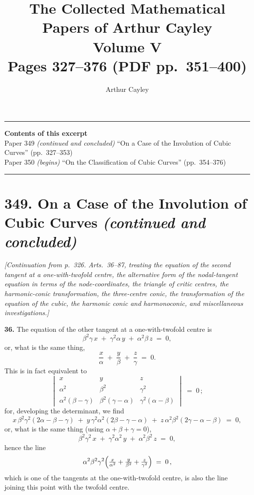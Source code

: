 \documentclass[11pt,a4paper]{article}
\title{\textbf{The Collected Mathematical Papers of Arthur Cayley}\\[6pt]
\Large Volume V\\[12pt]
\large Pages 327--376 \;(PDF pp.\ 351--400)}
\author{Arthur Cayley}
\date{}
\begin{document}
\maketitle
\thispagestyle{empty}

\vspace{1em}
\noindent\rule{\textwidth}{0.4pt}
\vspace{1em}

\begin{center}
\textbf{Contents of this excerpt}\\[4pt]
Paper 349 \textit{(continued and concluded)} ``On a Case of the Involution of Cubic Curves'' (pp.~327--353)\\
Paper 350 \textit{(begins)} ``On the Classification of Cubic Curves'' (pp.~354--376)
\end{center}

\noindent\rule{\textwidth}{0.4pt}
\vspace{1em}

\section*{349. On a Case of the Involution of Cubic Curves \textit{(continued and concluded)}}

\noindent\textit{[Continuation from p.~326. Arts.~36--87, treating the equation of the second tangent at a one-with-twofold centre, the alternative form of the nodal-tangent equation in terms of the node-coordinates, the triangle of critic centres, the harmonic-conic transformation, the three-centre conic, the transformation of the equation of the cubic, the harmonic conic and harmonoconic, and miscellaneous investigations.]}

\medskip

\textbf{36.} The equation of the other tangent at a one-with-twofold centre is
\[
\beta^{2}\gamma\,x \;+\; \gamma^{2}\alpha\,y \;+\; \alpha^{2}\beta\,z \;=\; 0,
\]
or, what is the same thing,
\[
\frac{x}{\alpha} \;+\; \frac{y}{\beta} \;+\; \frac{z}{\gamma} \;=\; 0.
\]
This is in fact equivalent to
\[
\begin{vmatrix}
x & y & z \\
\alpha^{2} & \beta^{2} & \gamma^{2} \\
\alpha^{2}(\beta-\gamma) & \beta^{2}(\gamma-\alpha) & \gamma^{2}(\alpha-\beta)
\end{vmatrix}
\;=\; 0\,;
\]
for, developing the determinant, we find
\[
x\,\beta^{2}\gamma^{2}(2\alpha-\beta-\gamma) \;+\; y\,\gamma^{2}\alpha^{2}(2\beta-\gamma-\alpha) \;+\; z\,\alpha^{2}\beta^{2}(2\gamma-\alpha-\beta) \;=\; 0,
\]
or, what is the same thing (using $\alpha+\beta+\gamma=0$),
\[
\beta^{2}\gamma^{2}\,x \;+\; \gamma^{2}\alpha^{2}\,y \;+\; \alpha^{2}\beta^{2}\,z \;=\; 0,
\]
hence the line
\[
\alpha^{2}\beta^{2}\gamma^{2}\Bigl(\tfrac{x}{\alpha^{2}}+\tfrac{y}{\beta^{2}}+\tfrac{z}{\gamma^{2}}\Bigr) \;=\; 0\,,
\]
which is one of the tangents at the one-with-twofold centre, is also the line joining this point with the twofold centre.
\end{document}
